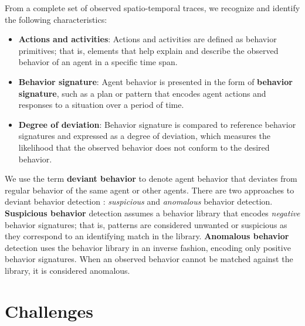 From a complete set of observed spatio-temporal traces, we recognize and identify the following characteristics:
\begin{itemize}

\item \textbf{Actions and activities}:  
Actions and activities are defined as behavior primitives; that is, elements that help explain and describe the observed behavior of an agent in a specific time span.

\item \textbf{Behavior signature}: 
Agent behavior is presented in the form of \textbf{behavior signature}, such as a plan or pattern that encodes agent actions and responses to a situation over a period of time.

\item \textbf{Degree of deviation}: Behavior signature is compared to reference behavior signatures and expressed as a degree of deviation, which measures the likelihood that the observed behavior does not conform to the desired behavior.

\end{itemize}



We use the term \textbf{deviant behavior} to denote agent behavior  that deviates from regular behavior of the same agent or other agents. There are two approaches to deviant behavior detection \citep{Avrahami-Zilberbrand2009}: \textit{suspicious} and \textit{anomalous} behavior detection. \textbf{Suspicious behavior} detection assumes a behavior library that encodes \textsl{negative} behavior signatures; that is, patterns are considered unwanted or suspicious as they correspond to an identifying match in the library. \textbf{Anomalous behavior} detection uses the behavior library in an inverse fashion, encoding only positive behavior signatures. When an observed behavior cannot be matched against the library, it is considered anomalous.

%
%
\section{Challenges}

